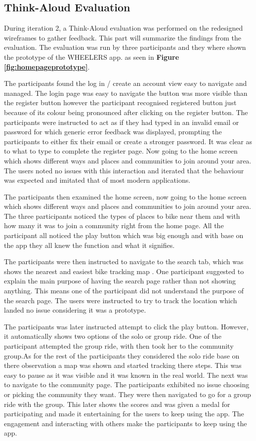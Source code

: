 \documentclass{l4proj}
\begin{document}
\subsection{Think-Aloud Evaluation} \label{ThinkAloud}
During iteration 2, a Think-Aloud evaluation was performed on the redesigned wireframes to gather feedback. This part will summarize the findings from the evaluation. The evaluation was run by three participants and they where shown the prototype of the WHEELERS app. as seen in \textbf{Figure \ref{fig:homepageprototype}}. 

The participants found the log in / create an account view easy to navigate and managed. The login page was easy to navigate the button was more visible than the register button however the participant recognised registered button just because of its colour being pronounced after clicking on the register button. The participants were instructed to act as if they had typed in an invalid email or password for which generic error feedback was displayed, prompting the participants to either fix their email or create a stronger password. It was clear as to what to type to complete the register page. Now going to the home screen which shows different ways and places and communities to join around your area. The users noted no issues with this interaction and iterated that the behaviour was expected and imitated that of most modern applications.


The participants then examined the home screen, now going to the home screen which shows different ways and places and communities to join around your area. The three participants noticed the types of places to bike near them and with how many it was to join a community right from the home page. All the participant all noticed the play button which was big enough and with base on the app they all knew the function and what it signifies.

The participants were then instructed to navigate to the search tab, which was shows the nearest and easiest bike tracking map . One participant suggested to explain the main purpose of having the search page rather than not showing anything. This means one of the participant did not understand the purpose of the search page. The users were instructed to try to track the location which landed no issue considering it was a prototype. 

The participants was later instructed attempt to click the play button. However, it automatically shows two options of the solo or group ride. One of the participant attempted the group ride, with then took her to the community group.As for the rest of the participants they considered the solo ride base on there observation a map was shown and started tracking there steps. This was easy to pause as it was visible and it was known in the real world. The next was to navigate to the community page. The participants exhibited no issue choosing  or picking the community they want. They were then navigated to go for a group ride with the group. This later shows the scores and was given a medal for participating and made it entertaining for the users to keep using the app. The engagement and interacting with others make the participants to keep using the app.
\end{document}
